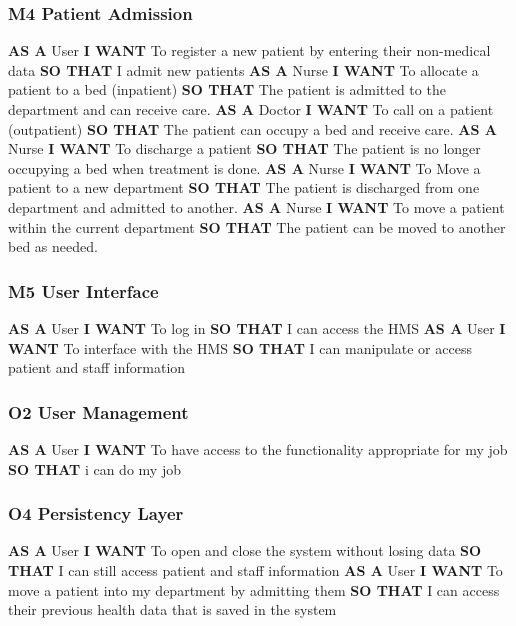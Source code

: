 \subsubsection*{M4 Patient Admission}
%
\textbf {AS A} User\hfill \break
\textbf{I WANT} To register a new patient by entering their non-medical data\hfill \break
\textbf {SO THAT} I admit new patients\hfill \medbreak
%
\textbf{AS A} Nurse\hfill \break
\textbf{I WANT} To allocate a patient to a bed (inpatient)\hfill \break
\textbf{SO THAT} The patient is admitted to the department and can receive care.\hfill \medbreak
%
\textbf{AS A} Doctor\hfill \break
\textbf{I WANT} To call on a patient (outpatient)\hfill \break
\textbf{SO THAT} The patient can occupy a bed and receive care.\hfill \break
%
\textbf{AS A} Nurse\hfill \break
\textbf{I WANT} To discharge a patient\hfill \break
\textbf{SO THAT} The patient is no longer occupying a bed when treatment is done.\hfill \medbreak
%
\textbf{AS A} Nurse\hfill \break
\textbf{I WANT} To Move a patient to a new department\hfill \break
\textbf{SO THAT} The patient is discharged from one department and admitted to another.\hfill \medbreak
%
\textbf{AS A} Nurse\hfill \break
\textbf{I WANT} To move a patient within the current department\hfill \break
\textbf{SO THAT} The patient can be moved to another bed as needed.\hfill \medbreak
%
\subsubsection*{M5 User Interface}
%
\textbf{AS A} User\hfill \break
\textbf{I WANT} To log in\hfill \break
\textbf{SO THAT} I can access the HMS\hfill \medbreak
%
\textbf{AS A} User\hfill \break
\textbf{I WANT} To interface with the HMS\hfill \break
\textbf{SO THAT} I can manipulate or access patient and staff information\hfill \medbreak
%
\subsubsection*{O2 User Management}
%
\textbf{AS A} User\hfill \break
\textbf{I WANT} To have access to the functionality appropriate for my job \hfill \break
\textbf{SO THAT} i can do my job\hfill \medbreak
%
\subsubsection*{O4 Persistency Layer}
%
\textbf{AS A} User\hfill \break
\textbf{I WANT} To open and close the system without losing data\hfill \break
\textbf{SO THAT} I can still access patient and staff information\hfill \medbreak
%
\textbf{AS A} User\hfill \break
\textbf{I WANT} To move a patient into my department by admitting them\hfill \break
\textbf{SO THAT} I can access their previous health data that is saved in the system\hfill \medbreak
%
